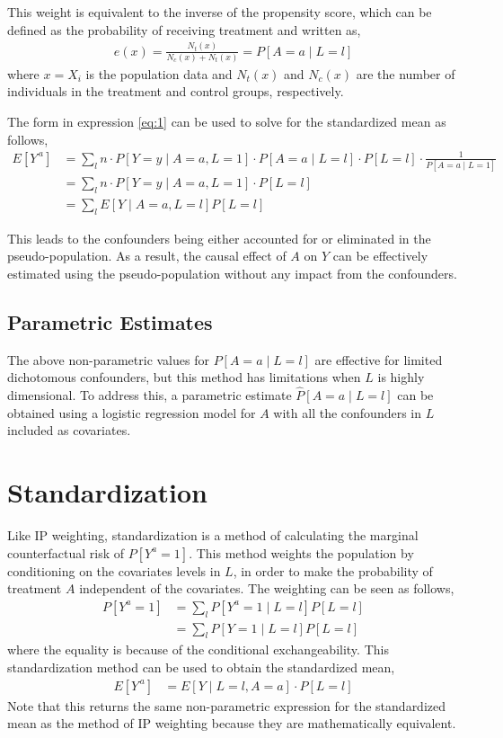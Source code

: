 This weight is equivalent to the inverse of the propensity score, which can be defined as the probability of receiving treatment and written as,\cite{imbens2015causal}
\begin{align} 
e(x) = \frac{N_t(x)}{N_c(x) + N_t(x)} = P[A=a \mid L = l] 
\end{align} 
where $x = X_i$ is the population data and $N_t(x)$ and $N_c (x)$ are the number of individuals in the treatment and control groups, respectively.  

The form in expression \ref{eq:1} can be used to solve for the standardized mean as follows, 
\begin{align} 
E[Y^{\,a}] &= \sum_l n \cdot P[Y=y \mid A = a, L= 1] \cdot P[A=a \mid L=l]  \cdot P[L=l] \cdot \frac{1}{P[A = a \mid L = 1]} \\ 
&=  \sum_l n \cdot P[Y=y \mid A = a, L= 1] \cdot P[L=l]\\ 
&= \sum_l E[Y \mid A=a, L= l] P[L=l] 
\end{align} 

This leads to the confounders being either accounted for or eliminated in the pseudo-population.  As a result, the causal effect of $A$ on $Y$ can be effectively estimated using the pseudo-population without any impact from the confounders.  

\subsection{Parametric Estimates} 
The above non-parametric values for $P[A=a\mid L=l]$ are effective for limited dichotomous confounders, but this method has limitations when $L$ is highly dimensional.  To address this, a parametric estimate $\widehat{P}[A=a\mid L=l]$ can be obtained using a logistic regression model for $A$ with all the confounders in $L$ included as covariates.  

\section{Standardization} \label{Standardization} 
Like IP weighting, standardization is a method of calculating the marginal counterfactual risk of $P[Y^a = 1]$.  This method weights the population by  conditioning on the covariates levels in $L$, in order to make the probability of treatment $A$ independent of the covariates.  The weighting can be seen as follows, 
\begin{align} 
P[Y^a = 1] &= \sum_l P[Y^a = 1 \mid L=l] P[L = l] \\ 
&= \sum_l P[Y = 1 \mid L=l] P[L = l]  
\end{align} 
where the equality is because of the conditional exchangeability.  This standardization method can be used to obtain the standardized mean, 
\begin{align} 
E[Y^{\,a}] &= E[Y \mid L = l, A =a ] \cdot P[L=l] 
\end{align} 
Note that this returns the same non-parametric expression for the standardized mean as the method of IP weighting because they are mathematically equivalent.  
